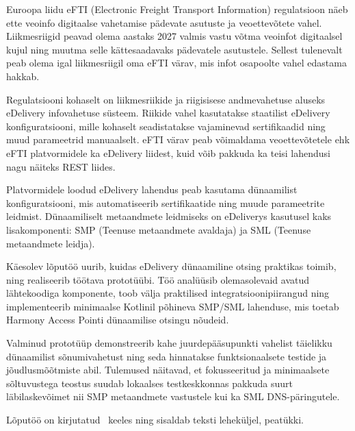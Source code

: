 Euroopa liidu eFTI (Electronic Freight Transport Information) regulatsioon näeb ette veoinfo digitaalse
vahetamise pädevate asutuste ja veoettevõtete vahel. Liikmesriigid peavad olema aastaks 2027 valmis vastu võtma
veoinfot digitaalsel kujul ning muutma selle kättesaadavaks pädevatele asutustele.
Sellest tulenevalt peab olema igal liikmesriigil oma eFTI värav, mis infot osapoolte vahel edastama hakkab.

Regulatsiooni kohaselt on liikmesriikide ja riigisisese andmevahetuse aluseks eDelivery infovahetuse süsteem.
Riikide vahel kasutatakse staatilist eDelivery konfiguratsiooni,
mille kohaselt seadistatakse vajaminevad sertifikaadid ning muud parameetrid manuaalselt.
eFTI värav peab võimaldama veoettevõtetele ehk eFTI platvormidele ka eDelivery liidest,
kuid võib pakkuda ka teisi lahendusi nagu näiteks REST liides.

Platvormidele loodud eDelivery lahendus peab kasutama dünaamilist konfiguratsiooni, mis automatiseerib
sertifikaatide ning muude parameetrite leidmist.
Dünaamiliselt metaandmete leidmiseks on eDeliverys kasutusel kaks lisakomponenti: SMP (Teenuse metaandmete avaldaja) ja SML (Teenuse metaandmete leidja).

Käesolev lõputöö uurib, kuidas eDelivery dünaamiline otsing praktikas toimib, ning realiseerib töötava prototüübi.
Töö analüüsib olemasolevaid avatud lähtekoodiga komponente, toob välja praktilised integratsioonipiirangud
ning implementeerib minimaalse Kotlinil põhineva SMP/SML lahenduse, mis toetab Harmony Access Pointi
dünaamilise otsingu nõudeid.

Valminud prototüüp demonstreerib kahe juurdepääsupunkti vahelist täielikku dünaamilist sõnumivahetust ning seda hinnatakse
funktsionaalsete testide ja jõudlusmõõtmiste abil. Tulemused näitavad, et fokusseeritud ja minimaalsete
sõltuvustega teostus suudab lokaalses testkeskkonnas pakkuda suurt läbilaskevõimet nii SMP metaandmete vastustele
kui ka SML DNS-päringutele.



Lõputöö on kirjutatud \langEst~keeles ning sisaldab teksti \calculatepages leheküljel, 
 peatükki.
